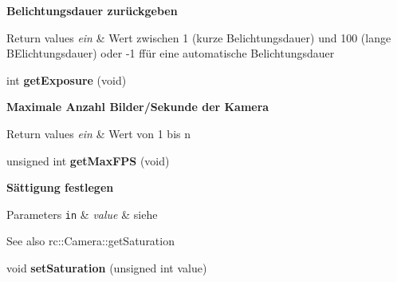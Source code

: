 \begin{Indent}{\bf Belichtungsdauer zurückgeben}\par
{\em 
\begin{DoxyRetVals}{Return values}
{\em ein} & Wert zwischen 1 (kurze Belichtungsdauer) und 100 (lange B\+Elichtungsdauer) oder -\/1 ffür eine automatische Belichtungsdauer \\
\hline
\end{DoxyRetVals}
}\begin{DoxyCompactItemize}
\item 
\hypertarget{classrc_1_1Camera_a6e906a0b175eb28fa1dd4dbab4aa697a}{int {\bfseries get\+Exposure} (void)}\label{classrc_1_1Camera_a6e906a0b175eb28fa1dd4dbab4aa697a}

\end{DoxyCompactItemize}
\end{Indent}
\begin{Indent}{\bf Maximale Anzahl Bilder/\+Sekunde der Kamera}\par
{\em 
\begin{DoxyRetVals}{Return values}
{\em ein} & Wert von 1 bis n \\
\hline
\end{DoxyRetVals}
}\begin{DoxyCompactItemize}
\item 
\hypertarget{classrc_1_1Camera_a1bb66807b50fe1e4e2d3941d266073cf}{unsigned int {\bfseries get\+Max\+F\+P\+S} (void)}\label{classrc_1_1Camera_a1bb66807b50fe1e4e2d3941d266073cf}

\end{DoxyCompactItemize}
\end{Indent}
\begin{Indent}{\bf Sättigung festlegen}\par
{\em 
\begin{DoxyParams}[1]{Parameters}
\mbox{\tt in}  & {\em value} & siehe \\
\hline
\end{DoxyParams}
\begin{DoxySeeAlso}{See also}
rc\+::\+Camera\+::get\+Saturation 
\end{DoxySeeAlso}
}\begin{DoxyCompactItemize}
\item 
\hypertarget{classrc_1_1Camera_ace923daca0f3b491c966630b441a916e}{void {\bfseries set\+Saturation} (unsigned int value)}\label{classrc_1_1Camera_ace923daca0f3b491c966630b441a916e}

\end{DoxyCompactItemize}
\end{Indent}
